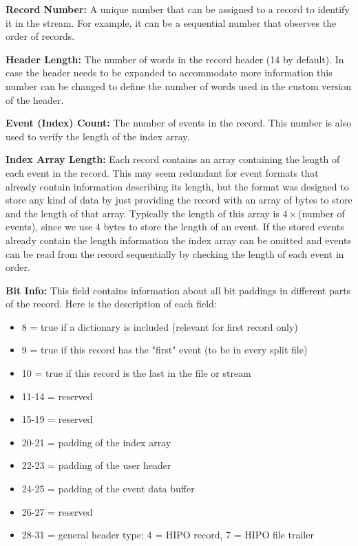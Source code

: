 \documentclass[preprint,12pt]{elsarticle}
\begin{document}
{\bf Record Number:} A unique number that can be assigned to a record to identify it in the stream. For example, it can be a sequential 
number that observes the order of records.

{\bf Header Length:} The number of words in the record header (14 by default). In case the header needs to be expanded to accommodate more information
this number can be changed to define the number of words used in the custom version of the header.

{\bf Event (Index) Count:} The number of events in the record. This number is also used to verify the length of the index array.

{\bf Index Array Length:} Each record contains an array containing the length of each event in the record. This may seem redundant for event formats that 
already contain information describing its length, but the format was designed to store any kind of data by just providing the record with an array of 
bytes to store and the length of that array. Typically the length of this array is $4\times$(number of events), since we use 4 bytes to store the length of an event. 
If the stored events already contain the length 
information the index array can be omitted and events can be read from the record sequentially by checking the length of each event in order.

{\bf Bit Info:} This field contains information about all bit paddings in different parts of the record.
Here is the description of each field:
  
  \begin{itemize}
  \item    8    = true if a dictionary is included (relevant for first record only)
 \item    9    = true if this record has the "first" event (to be in every split file)
 \item    10    = true if this record is the last in the file or stream
 \item    11-14 = reserved
 \item    15-19 = reserved
 \item    20-21 = padding of the index array
 \item    22-23 = padding of the user header
 \item    24-25 = padding of the event data buffer
 \item    26-27 = reserved
 \item    28-31 = general header type: 4 = HIPO record, 7 = HIPO file trailer
 \end{itemize}
\end{document}
